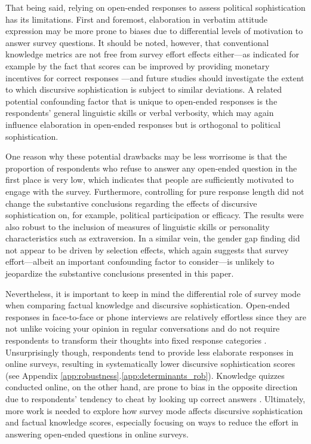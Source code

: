 That being said, relying on open-ended responses to assess political sophistication has its limitations. First and foremost, elaboration in verbatim attitude expression may be more prone to biases due to differential levels of motivation to answer survey questions. It should be noted, however, that conventional knowledge metrics are not free from survey effort effects either---as indicated for example by the fact that scores can be improved by providing monetary incentives for correct responses \citep{prior2008money}---and future studies should investigate the extent to which discursive sophistication is subject to similar deviations. A related potential confounding factor that is unique to open-ended responses is the respondents' general linguistic skills or verbal verbosity, which may again influence elaboration in open-ended responses but is orthogonal to political sophistication.

One reason why these potential drawbacks may be less worrisome is that the proportion of respondents who refuse to answer any open-ended question in the first place is very low, which indicates that people are sufficiently motivated to engage with the survey. Furthermore, controlling for pure response length did not change the substantive conclusions regarding the effects of discursive sophistication on, for example, political participation or efficacy. The results were also robust to the inclusion of measures of linguistic skills or personality characteristics such as extraversion. In a similar vein, the gender gap finding did not appear to be driven by selection effects, which again suggests that survey effort---albeit an important confounding factor to consider---is unlikely to jeopardize the substantive conclusions presented in this paper.

Nevertheless, it is important to keep in mind the differential role of survey mode when comparing factual knowledge and discursive sophistication. Open-ended responses in face-to-face or phone interviews are relatively effortless since they are not unlike voicing your opinion in regular conversations and do not require respondents to transform their thoughts into fixed response categories \citep[e.g.,][]{sudman1996thinking}. Unsurprisingly though, respondents tend to provide less elaborate responses in online surveys, resulting in systematically lower discursive sophistication scores (see Appendix \ref{app:robustness}.\ref{app:determinants_rob}). Knowledge quizzes conducted online, on the other hand, are prone to bias in the opposite direction due to respondents' tendency to cheat by looking up correct answers \citep{clifford2016cheating}. Ultimately, more work is needed to explore how survey mode affects discursive sophistication and factual knowledge scores, especially focusing on ways to reduce the effort in answering open-ended questions in online surveys.

